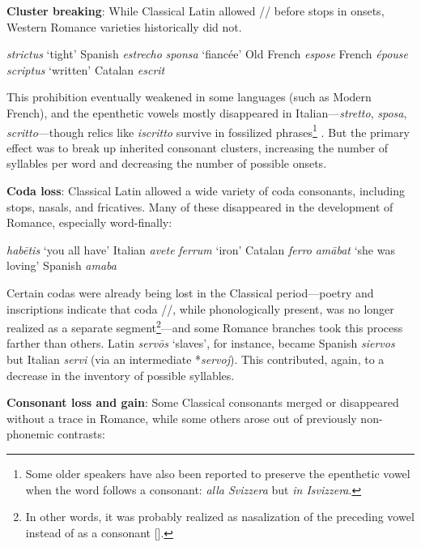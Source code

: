 \documentclass[12pt,twoside,leqno]{article} %
\newcommand{\ipa}[1]{/\textipa{#1}/}
\newcommand{\ipab}[1]{[\textipa{#1}]}
\newcommand{\yields}{\textrightarrow}
\begin{document}
\textbf{Cluster breaking}: While Classical Latin allowed \ipa{s} before stops in onsets, Western Romance varieties historically did not.

\begin{exe}
\ex \emph{strictus} `tight' \yields{} Spanish \emph{estrecho}
\ex \emph{sponsa} `fiancée' \yields{} Old French \emph{espose} \yields{} French \emph{épouse}
\ex \emph{scriptus} `written' \yields{} Catalan \emph{escrit}
\end{exe}

This prohibition eventually weakened in some languages (such as Modern French), and the epenthetic vowels mostly disappeared in Italian---\emph{stretto}, \emph{sposa}, \emph{scritto}---though relics like \emph{iscritto} survive in fossilized phrases\footnote{Some older speakers have also been reported to preserve the epenthetic vowel when the word follows a consonant: \emph{alla Svizzera} but \emph{in Isvizzera}.} \citep{alkire}. But the primary effect was to break up inherited consonant clusters, increasing the number of syllables per word and decreasing the number of possible onsets.

\textbf{Coda loss}: Classical Latin allowed a wide variety of coda consonants, including stops, nasals, and fricatives. Many of these disappeared in the development of Romance, especially word-finally:

\begin{exe}
\ex \emph{hab\=etis} `you all have' \yields{} Italian \emph{avete}
\ex \emph{ferrum} `iron' \yields{} Catalan \emph{ferro}
\ex \emph{am\=abat} `she was loving' \yields{} Spanish \emph{amaba}
\end{exe}

Certain codas were already being lost in the Classical period---poetry and inscriptions indicate that coda \ipa{m}, while phonologically present, was no longer realized as a separate segment\footnote{In other words, it was probably realized as nasalization of the preceding vowel instead of as a consonant \ipab{m}.}---and some Romance branches took this process farther than others. Latin \emph{serv\=os} `slaves', for instance, became Spanish \emph{siervos} but Italian \emph{servi} (via an intermediate *\emph{servoj}). This contributed, again, to a decrease in the inventory of possible syllables.

\textbf{Consonant loss and gain}: Some Classical consonants merged or disappeared without a trace in Romance, while some others arose out of previously non-phonemic contrasts:
\end{document}
